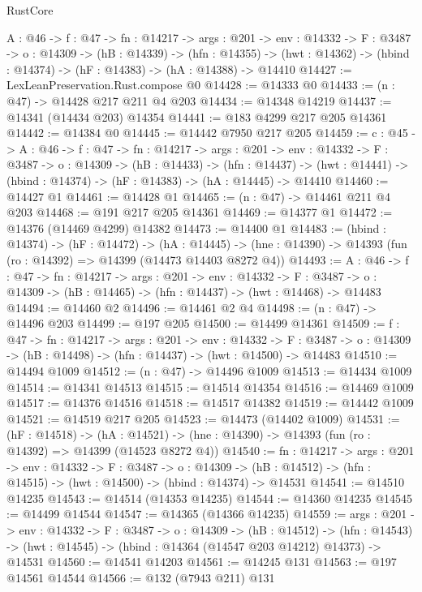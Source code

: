 \begin{lexlean}{RustCore}
\begin{coremodule}
  {A : @46} ->
  {f : @47} ->
  {fn : @14217} ->
  {args : @201} ->
  {env : @14332} ->
  {F : @3487} ->
  {o : @14309} ->
  (hB : @14339) ->
  (hfn : @14355) -> (hwt : @14362) -> (hbind : @14374) -> (hF : @14383) -> (hA : @14388) -> @14410
@14427 := LexLeanPreservation.Rust.compose @0
@14428 := @14333 @0
@14433 := (n : @47) -> @14428 @217 @211 @4 @203
@14434 := @14348 @14219
@14437 := @14341 (@14434 @203) @14354
@14441 := @183 @4299 @217 @205 @14361
@14442 := @14384 @0
@14445 := @14442 @7950 @217 @205
@14459 := {c : @45} ->
  {A : @46} ->
  {f : @47} ->
  {fn : @14217} ->
  {args : @201} ->
  {env : @14332} ->
  {F : @3487} ->
  {o : @14309} ->
  (hB : @14433) ->
  (hfn : @14437) -> (hwt : @14441) -> (hbind : @14374) -> (hF : @14383) -> (hA : @14445) -> @14410
@14460 := @14427 @1
@14461 := @14428 @1
@14465 := (n : @47) -> @14461 @211 @4 @203
@14468 := @191 @217 @205 @14361
@14469 := @14377 @1
@14472 := @14376 (@14469 @4299) @14382
@14473 := @14400 @1
@14483 := (hbind : @14374) ->
  (hF : @14472) ->
  (hA : @14445) -> (hne : @14390) -> @14393 (fun (ro : @14392) => @14399 (@14473 @14403 @8272 @4))
@14493 := {A : @46} ->
  {f : @47} ->
  {fn : @14217} ->
  {args : @201} ->
  {env : @14332} ->
  {F : @3487} -> {o : @14309} -> (hB : @14465) -> (hfn : @14437) -> (hwt : @14468) -> @14483
@14494 := @14460 @2
@14496 := @14461 @2 @4
@14498 := (n : @47) -> @14496 @203
@14499 := @197 @205
@14500 := @14499 @14361
@14509 := {f : @47} ->
  {fn : @14217} ->
  {args : @201} ->
  {env : @14332} ->
  {F : @3487} -> {o : @14309} -> (hB : @14498) -> (hfn : @14437) -> (hwt : @14500) -> @14483
@14510 := @14494 @1009
@14512 := (n : @47) -> @14496 @1009
@14513 := @14434 @1009
@14514 := @14341 @14513
@14515 := @14514 @14354
@14516 := @14469 @1009
@14517 := @14376 @14516
@14518 := @14517 @14382
@14519 := @14442 @1009
@14521 := @14519 @217 @205
@14523 := @14473 (@14402 @1009)
@14531 := (hF : @14518) ->
  (hA : @14521) -> (hne : @14390) -> @14393 (fun (ro : @14392) => @14399 (@14523 @8272 @4))
@14540 := {fn : @14217} ->
  {args : @201} ->
  {env : @14332} ->
  {F : @3487} ->
  {o : @14309} -> (hB : @14512) -> (hfn : @14515) -> (hwt : @14500) -> (hbind : @14374) -> @14531
@14541 := @14510 @14235
@14543 := @14514 (@14353 @14235)
@14544 := @14360 @14235
@14545 := @14499 @14544
@14547 := @14365 (@14366 @14235)
@14559 := {args : @201} ->
  {env : @14332} ->
  {F : @3487} ->
  {o : @14309} ->
  (hB : @14512) ->
  (hfn : @14543) -> (hwt : @14545) -> (hbind : @14364 (@14547 @203 @14212) @14373) -> @14531
@14560 := @14541 @14203
@14561 := @14245 @131
@14563 := @197 @14561 @14544
@14566 := @132 (@7943 @211) @131

\end{coremodule}
\end{lexlean}
